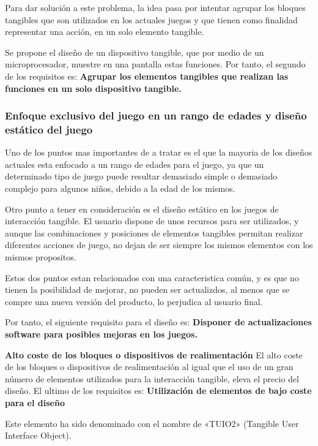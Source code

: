 Para dar solución a este problema, la idea pasa por intentar agrupar los bloques tangibles que son utilizados en los actuales juegos y que tienen como finalidad representar una acción, en un solo elemento tangible.

Se propone el diseño de un dispositivo tangible, que por medio de un microprocesador, muestre en una pantalla estas funciones. 
Por tanto, el segundo de los requisitos es: \textbf{Agrupar los elementos tangibles que realizan las funciones en un solo dispositivo tangible.}


\subsubsection{Enfoque exclusivo del juego en un rango de edades y diseño estático del juego}

Uno de los puntos mas importantes de a tratar es el que la mayoria de los diseños actuales esta enfocado a un rango de edades para el juego, ya que un determinado tipo de juego puede resultar demasiado simple o demasiado complejo para algunos niños, debido a la edad de los mismos. 

Otro punto a tener en consideración es el diseño estático en los juegos de interacción tangible. El usuario dispone de unos recursos para ser utilizados, y aunque las combinaciones y posiciones de elementos tangibles permitan realizar diferentes acciones de juego, no dejan de ser siempre los mismos elementos con los mismos propositos.

Estos dos puntos estan relacionados con una caracteristica común, y es que no tienen la posibilidad de mejorar, no pueden ser actualizdos, al menos que se compre una nueva versión del producto, lo perjudica al usuario final.

Por tanto, el siguiente requisito para el diseño es: \textbf{Disponer de actualizaciones software para posibles mejoras en los juegos.}

\textbf{Alto coste de los bloques o dispositivos de realimentación}
El alto coste de los bloques o dispositivos de realimentación al igual que el uso de un gran número de elementos utilizados para la interacción tangible, eleva el precio del
diseño.
El ultimo de los requisitos es: \textbf{Utilización de elementos de bajo coste para el diseño}





Este elemento ha sido denominado con el nombre de «TUIO2» (Tangible User Interface Object).

